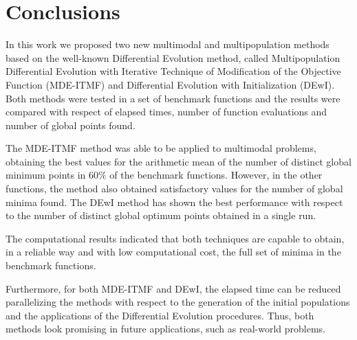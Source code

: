 \documentclass[smallextended]{svjour3}       %
\begin{document}

\section{Conclusions} \label{sec:conclusions}

In this work we proposed two new multimodal and multipopulation methods based on the well-known Differential Evolution method, called Multipopulation Differential Evolution with Iterative Technique of Modification of the Objective Function (MDE-ITMF) and Differential Evolution with Initialization (DEwI). Both methods were tested in a set of benchmark functions and the results were compared with respect of elapsed times, number of function evaluations and number of global points found.


The MDE-ITMF method was able to be applied to multimodal problems, obtaining the best values for the arithmetic mean of the number of distinct global minimum points in $60\%$ of the benchmark functions. However, in the other functions, the method also obtained satisfactory values for the number of global minima found. The DEwI method has shown the best performance with respect to the number of distinct global optimum points obtained in a single run.

The computational results indicated that both techniques are capable to obtain, in a reliable way and with low computational cost, the full set of minima in the benchmark functions.

Furthermore, for both MDE-ITMF and DEwI, the elapsed time can be reduced parallelizing the methods with respect to the generation of the initial populations and the applications of the Differential Evolution procedures. Thus, both methods look promising in future applications, such as real-world problems.
\end{document}
